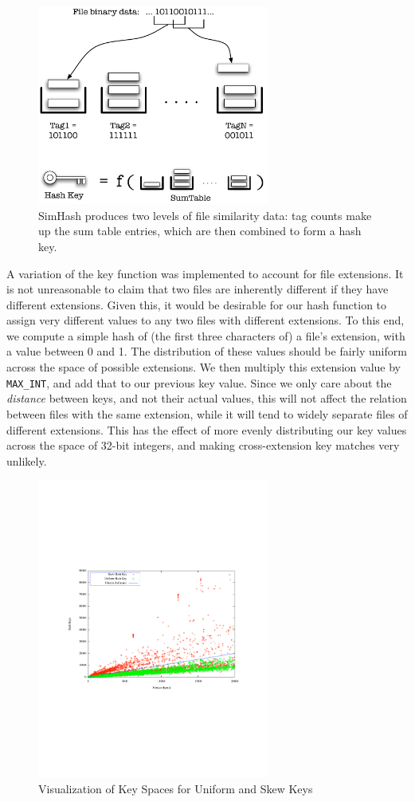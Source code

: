 \documentclass[10pt, twocolumn]{article}
\begin{document}
 \begin{figure}[t] 
 \centering
\includegraphics[width= 3in]{simHashInternals.pdf}
\caption{SimHash produces two levels of file similarity data: tag counts make up the sum table entries, which are then combined to form a hash key.}
\label{simHash} 
\end{figure}   

A variation of the key function was implemented to account for file extensions.  It is not unreasonable to claim that two files are inherently different if they have different extensions.  Given this, it would be desirable for our hash function to assign very different values to any two files with different extensions.  To this end, we compute a simple hash of (the first three characters of) a file's extension, with a value between 0 and 1.  The distribution of these values should be fairly uniform across the space of possible extensions.  We then multiply this extension value by {\tt MAX\_INT}, and add that to our previous key value.  Since we only care about the {\it distance} between keys, and not their actual values, this will not affect the relation between files with the same extension, while it will tend to widely separate files of different extensions.  This has the effect of more evenly distributing our key values across the space of 32-bit integers, and making cross-extension key matches very unlikely.

 \begin{figure}[h] 
 \centering
\includegraphics[width= 3in]{scatter_circles.pdf}
\caption{Visualization of Key Spaces for Uniform and Skew Keys}
\label{scatterPoster} 
\end{figure}   
\end{document}
